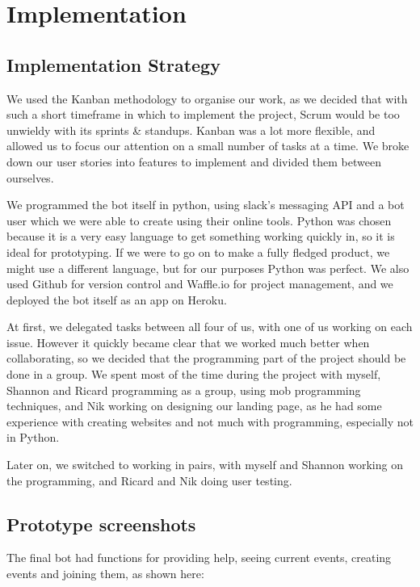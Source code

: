 \documentclass[12pt]{report}
\begin{document}
\chapter{Implementation}\label{implementation}
\section{Implementation Strategy}
We used the Kanban methodology to organise our work, as we decided that with such a short timeframe in which to implement the project, Scrum would be too unwieldy with its sprints \& standups. Kanban was a lot more flexible, and allowed us to focus our attention on a small number of tasks at a time. We broke down our user stories into features to implement and divided them between ourselves.

\vspace{3mm}

We programmed the bot itself in python, using slack's messaging API and a bot user which we were able to create using their online tools. Python was chosen because it is a very easy language to get something working quickly in, so it is ideal for prototyping. If we were to go on to make a fully fledged product, we might use a different language, but for our purposes Python was perfect. We also used Github for version control and Waffle.io for project management, and we deployed the bot itself as an app on Heroku.

\vspace{3mm}

At first, we delegated tasks between all four of us, with one of us working on each issue. However it quickly became clear that we worked much better when collaborating, so we decided that the programming part of the project should be done in a group. We spent most of the time during the project with myself, Shannon and Ricard programming as a group, using mob programming techniques, and Nik working on designing our landing page, as he had some experience with creating websites and not much with programming, especially not in Python.

\vspace{3mm}

Later on, we switched to working in pairs, with myself and Shannon working on the programming, and Ricard and Nik doing user testing.

\section{Prototype screenshots}
The final bot had functions for providing help, seeing current events, creating events and joining them, as shown here:
\end{document}
